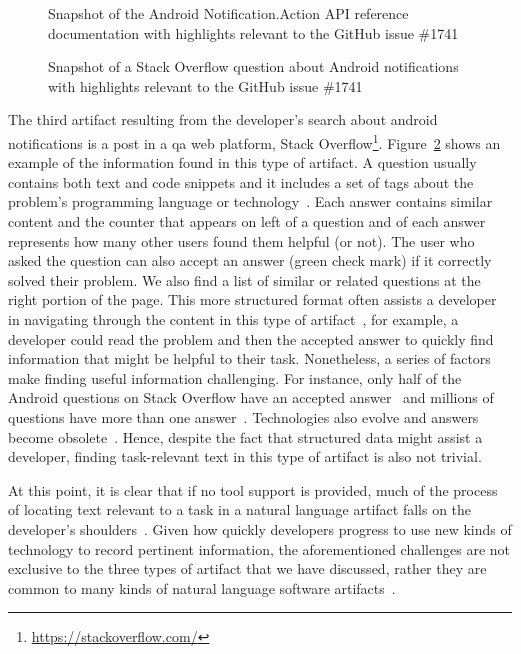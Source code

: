 \begin{figure}
    \centering
    \caption{Snapshot of the Android Notification.Action API reference documentation with highlights relevant to the GitHub issue \#1741}
    \label{fig:api-notification-action}
\end{figure}





\begin{figure}
    \centering
    \caption{Snapshot of a Stack Overflow question about Android notifications  with highlights relevant to the GitHub issue \#1741}
    \label{fig:qa-notification-icon}
\end{figure}


The third artifact resulting from the developer's search 
about android notifications 
is a post in a \acf{qa} web platform, Stack Overflow\footnote{\url{https://stackoverflow.com/}}.
Figure~\ref{fig:qa-notification-icon} shows an example of the information found in this type of artifact.
A question usually contains both text and code snippets
and it includes a set of tags  about the
problem's programming language or technology~\cite{Treude2011a}. 
Each answer contains similar content and 
the counter that appears on left of a question and of each answer
represents how many other users found them helpful (or not).
The user who asked the question can also accept an answer (green check mark)
if it correctly solved their problem.
We also find a list of similar or related questions 
at the right portion of the page. 
This more structured format often assists a developer 
in navigating through the content in this type of artifact~\cite{nadi2020}, for example, a developer could read the problem and 
then the accepted answer to quickly find information that might be helpful 
to their task. Nonetheless, a series of factors make finding useful information challenging. 
For instance, only half of the Android questions on Stack Overflow
have an accepted answer~\cite{parnin2012} 
and millions of questions have more than one answer~\cite{nadi2020}.
Technologies also evolve and answers become obsolete~\cite{Allamanis2013}.
Hence, despite the fact that structured data  might 
assist a developer, finding task-relevant text in this type of artifact is also not 
trivial.





At this point, it is clear that if no tool support is provided, much of the process of locating text 
relevant to a task in a natural language artifact falls on the developer's shoulders~\cite{gonccalves2011, Ko2006a, Bystrom1995}. Given how quickly developers progress to use new kinds of technology to
record pertinent information, the aforementioned challenges are not exclusive 
to the three types of artifact that we have discussed, rather 
they are common to many kinds of natural language software artifacts~\cite{Li2013, Starke2009}.




 
 